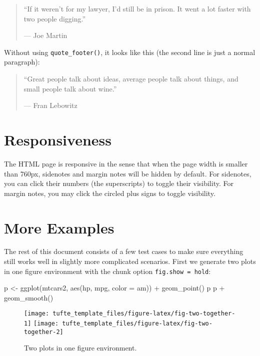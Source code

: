 \documentclass[a4paper,14pt]{tufte-handout}
\newenvironment{Shaded}{}{}
\newcommand{\AttributeTok}[1]{\textcolor[rgb]{0.49,0.56,0.16}{#1}}
\newcommand{\FunctionTok}[1]{\textcolor[rgb]{0.02,0.16,0.49}{#1}}
\newcommand{\NormalTok}[1]{#1}
\newcommand{\OtherTok}[1]{\textcolor[rgb]{0.00,0.44,0.13}{#1}}
\newcommand{\SpecialCharTok}[1]{\textcolor[rgb]{0.25,0.44,0.63}{#1}}
\begin{document}
\begin{quote}
``If it weren't for my lawyer, I'd still be in prison. It went a lot
faster with two people digging.''

\hfill --- Joe Martin
\end{quote}

Without using \texttt{quote\_footer()}, it looks like this (the second
line is just a normal paragraph):

\begin{quote}
``Great people talk about ideas, average people talk about things, and
small people talk about wine.''

--- Fran Lebowitz
\end{quote}

\hypertarget{responsiveness}{%
\section{Responsiveness}\label{responsiveness}}

The HTML page is responsive in the sense that when the page width is
smaller than 760px, sidenotes and margin notes will be hidden by
default. For sidenotes, you can click their numbers (the superscripts)
to toggle their visibility. For margin notes, you may click the circled
plus signs to toggle visibility.

\hypertarget{more-examples}{%
\section{More Examples}\label{more-examples}}

The rest of this document consists of a few test cases to make sure
everything still works well in slightly more complicated scenarios.
First we generate two plots in one figure environment with the chunk
option \texttt{fig.show\ =\ \textquotesingle{}hold\textquotesingle{}}:

\begin{Shaded}
\begin{Highlighting}[numbers=left,,]
\NormalTok{p }\OtherTok{\textless{}{-}} \FunctionTok{ggplot}\NormalTok{(mtcars2, }\FunctionTok{aes}\NormalTok{(hp, mpg, }\AttributeTok{color =}\NormalTok{ am)) }\SpecialCharTok{+}
  \FunctionTok{geom\_point}\NormalTok{()}
\NormalTok{p}
\NormalTok{p }\SpecialCharTok{+} \FunctionTok{geom\_smooth}\NormalTok{()}
\end{Highlighting}
\end{Shaded}

\begin{figure}

{\centering \texttt{[image: tufte\_template\_files/figure-latex/fig-two-together-1]} \texttt{[image: tufte\_template\_files/figure-latex/fig-two-together-2]} 

}

\caption[Two plots in one figure environment]{Two plots in one figure environment.}\label{fig:fig-two-together}
\end{figure}
\end{document}
